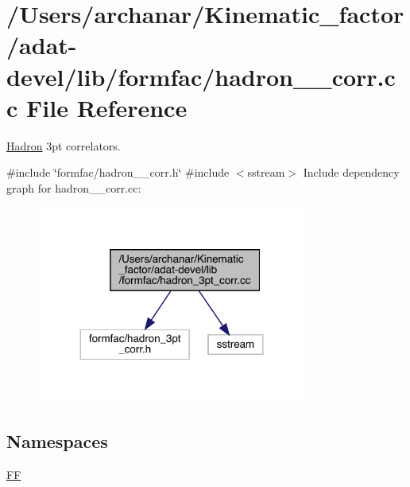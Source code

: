\hypertarget{adat-devel_2lib_2formfac_2hadron__3pt__corr_8cc}{}\section{/\+Users/archanar/\+Kinematic\+\_\+factor/adat-\/devel/lib/formfac/hadron\+\_\+3pt\+\_\+corr.cc File Reference}
\label{adat-devel_2lib_2formfac_2hadron__3pt__corr_8cc}


\mbox{\hyperlink{namespaceHadron}{Hadron}} 3pt correlators.  


{\ttfamily \#include \char`\"{}formfac/hadron\+\_\+3pt\+\_\+corr.\+h\char`\"{}}\newline
{\ttfamily \#include $<$sstream$>$}\newline
Include dependency graph for hadron\+\_\+3pt\+\_\+corr.\+cc\+:
\nopagebreak
\begin{figure}[H]
\begin{center}
\leavevmode
\includegraphics[width=252pt]{d8/db8/adat-devel_2lib_2formfac_2hadron__3pt__corr_8cc__incl}
\end{center}
\end{figure}
\subsection*{Namespaces}
\begin{DoxyCompactItemize}
\item 
 \mbox{\hyperlink{namespaceFF}{FF}}
\end{DoxyCompactItemize}
